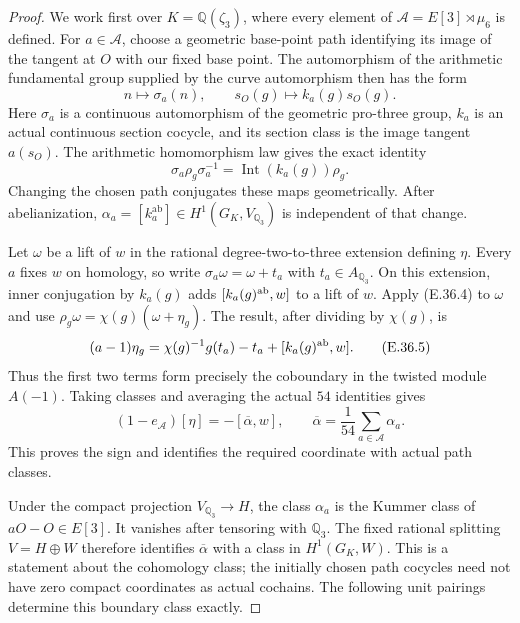 \documentclass[11pt,oneside]{article}
\begin{document}
\begin{proof}
We work first over $K=\mathbb Q(\zeta_3)$,
where every element of
$\mathcal A=E[3]\rtimes\mu_6$ is defined.
For $a\in\mathcal A$, choose a geometric
base-point path identifying its image of
the tangent at $O$ with our fixed base point.
The automorphism of the arithmetic fundamental
group supplied by the curve automorphism
then has the form
\[
 n\longmapsto\sigma_a(n),\qquad
 s_O(g)\longmapsto k_a(g)s_O(g).
 \tag{E.36.3}
\]
Here $\sigma_a$ is a continuous automorphism
of the geometric pro-three group, $k_a$ is
an actual continuous section cocycle, and
its section class is the image tangent
$a(s_O)$. The arithmetic homomorphism law
gives the exact identity
\[
 \sigma_a\rho_g\sigma_a^{-1}
        =\operatorname{Int}(k_a(g))\rho_g.
 \tag{E.36.4}
\]
Changing the chosen path conjugates these
maps geometrically. After abelianization,
$\alpha_a=[k_a^{\mathrm{ab}}]\in H^1(G_K,V_{\mathbb Q_3})$
is independent of that change.

Let $\omega$ be a lift of $w$ in the rational
degree-two-to-three extension defining $\eta$.
Every $a$ fixes $w$ on homology, so write
$\sigma_a\omega=\omega+t_a$ with $t_a\in A_{\mathbb Q_3}$.
On this extension, inner conjugation by
$k_a(g)$ adds $[k_a(g)^{\rm ab},w]$ to a lift
of $w$. Apply (E.36.4) to $\omega$ and use
$\rho_g\omega=\chi(g)(\omega+\eta_g)$.
The result, after dividing by $\chi(g)$, is
\[
 (a-1)\eta_g
    =\chi(g)^{-1}g(t_a)-t_a
                    +[k_a(g)^{\rm ab},w].
 \tag{E.36.5}
\]
Thus the first two terms form precisely the
coboundary in the twisted module $A(-1)$.
Taking classes and averaging the actual
$54$ identities gives
\[
 (1-e_{\mathcal A})[\eta]
       =-[\overline\alpha,w],
 \qquad
 \overline\alpha=\frac1{54}\sum_{a\in\mathcal A}\alpha_a.
 \tag{E.36.6}
\]
This proves the sign and identifies the
required coordinate with actual path classes.

Under the compact projection
$V_{\mathbb Q_3}\to H$, the class $\alpha_a$
is the Kummer class of $aO-O\in E[3]$.
It vanishes after tensoring with $\mathbb Q_3$.
The fixed rational splitting $V=H\oplus W$
therefore identifies $\overline\alpha$ with
a class in $H^1(G_K,W)$. This is a statement
about the cohomology class; the initially
chosen path cocycles need not have zero
compact coordinates as actual cochains.
The following unit pairings determine this
boundary class exactly.


\end{proof}
\end{document}
